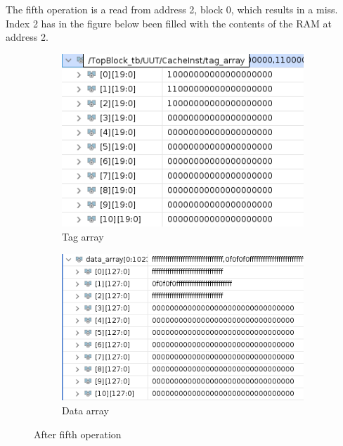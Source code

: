 \documentclass{article}
\begin{document}
The fifth operation is a read from address 2, block 0, which results in a miss. Index 2 has in the figure below been filled with the contents of the RAM at address 2.
\begin{figure}[H]
\centering
\begin{subfigure}{.5\textwidth}
  \centering
  \includegraphics[width=.8\linewidth]{img/tag3.png}
  \caption{Tag array}
\end{subfigure}%
\begin{subfigure}{.5\textwidth}
  \centering
  \includegraphics[width=.9\linewidth]{img/data3.png}
  \caption{Data array}
\end{subfigure}
\caption{After fifth operation}
\end{figure}
\end{document}
